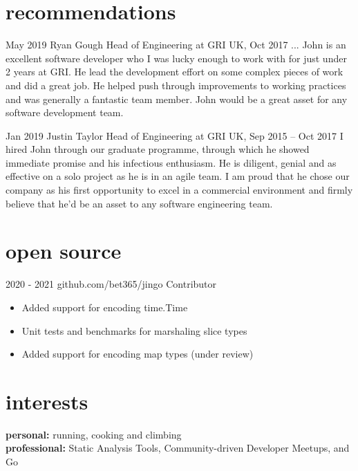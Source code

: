\documentclass[]{friggeri-cv-a4} %
\begin{document}
\section{recommendations}

\begin{entrylist}

\entry
{May 2019}
{Ryan Gough}
{Head of Engineering at GRI UK, Oct 2017 ...}
{
    John is an excellent software developer who I was lucky enough to work with for just under 2 years at GRI. He lead the development effort on some complex pieces of work and did a great job. He helped push through improvements to working practices and was generally a fantastic team member. John would be a great asset for any software development team.
}

\entry
{Jan 2019}
{Justin Taylor}
{Head of Engineering at GRI UK, Sep 2015 -- Oct 2017}
{
    I hired John through our graduate programme, through which he showed immediate promise and his infectious enthusiasm. He is diligent, genial and as effective on a solo project as he is in an agile team. I am proud that he chose our company as his first opportunity to excel in a commercial environment and firmly believe that he'd be an asset to any software engineering team.
}

\end{entrylist}

\section{open source}

\begin{entrylist}

\entry
{2020 - 2021}
{github.com/bet365/jingo}
{Contributor}
{
\begin{itemize}
\item Added support for encoding time.Time
\item Unit tests and benchmarks for marshaling slice types
\item Added support for encoding map types (under review)
\end{itemize}
}
\end{entrylist}

\section{interests}

\textbf{personal:} running, cooking and climbing \\
\textbf{professional:} Static Analysis Tools, Community-driven Developer Meetups, and Go
\end{document}
